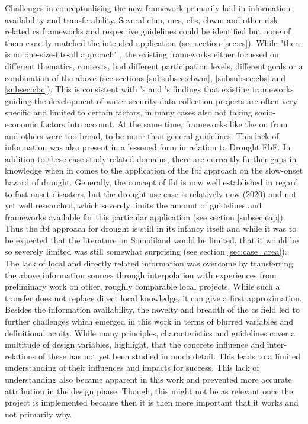 Challenges in conceptualising the new framework primarily laid in information availability and transferability. Several \acrshort{cbm}, \acrshort{mcs}, \acrshort{cbs}, \acrshort{cbwm} and other risk related \acrshort{cs} frameworks and respective guidelines could be identified but none of them exactly matched the intended application (see section \ref{sec:cs}). While "there is no one-size-fits-all approach" \autocite[2]{fraislCitizenScienceEnvironmental2022}, the existing frameworks either focussed on different thematics, contexts, had different participation levels, different goals or a combination of the above (see sections \ref{subsubsec:cbwm}, \ref{subsubsec:cbs} and \ref{subsec:cbc}). This is consistent with \autocite{butteFrameworkWaterSecurity2022}'s and \autocite{carrionCROWDSOURCINGWATERQUALITY2020}'s findings that existing frameworks guiding the development of water security data collection projects are often very specific and limited to certain factors, in many cases also not taking socio-economic factors into account. At the same time, frameworks like the on from \autocite{butteFrameworkWaterSecurity2022,eu-citizen.scienceEUCitizenScience,citizenscience.govBasicStepsYour} and others were too broad, to be more than general guidelines.
This lack of information was also present in a lessened form in relation to Drought FbF. In addition to these case study related domains, there are currently further gaps in knowledge when in comes to the application of the \acrshort{fbf} approach on the slow-onset hazard of drought. Generally, the concept of \acrshort{fbf} is now well established in regard to fast-onset disasters, but the drought use case is relatively new (2020) and not yet well researched, which severely limits the amount of guidelines and frameworks available for this particular application (see section \ref{subsec:eap}). Thus the \acrshort{fbf} approach for drought is still in its infancy itself and while it was to be expected that the literature on Somaliland would be limited, that it would be so severely limited was still somewhat surprising (see section \ref{sec:case_area}). The lack of local and directly related information was overcome by transferring the above information sources through interpolation with experiences from preliminary work on other, roughly comparable local projects. While such a transfer does not replace direct local knowledge, it can give a first approximation.\newline
Besides the information availability, the novelty and breadth of the \acrshort{cs} field led to further challenges which emerged in this work in terms of blurred variables and definitional acuity. While many principles, characteristics and guidelines cover a multitude of design variables, \autocite{kirschkeCitizenScienceProjects2022} highlight, that the concrete influence and inter-relations of these has not yet been studied in much detail. This leads to a limited understanding of their influences and impacts for success. This lack of understanding also became apparent in this work and prevented more accurate attribution in the design phase. Though, this might not be as relevant once the project is implemented because then it is then more important that it works and not primarily why.\newline
